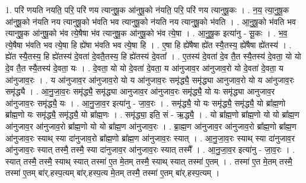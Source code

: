 \documentclass[17pt]{extarticle}
\begin{document}
1. परि॑ णयति नयति॒ परि॒ परि॑ णय त्यानुषू॒क आ॑नुषू॒को न॑यति॒ परि॒ परि॑ णय त्यानुषू॒कः । . न॒य॒ त्या॒नु॒षू॒क आ॑नुषू॒को न॑यति नय त्यानुषू॒को भ॑वति भव त्यानुषू॒को न॑यति नय त्यानुषू॒को भ॑वति । . आ॒नु॒षू॒को भ॑वति भव त्यानुषू॒क आ॑नुषू॒को भ॑व त्ये॒षैषा भ॑व त्यानुषू॒क आ॑नुषू॒को भ॑व त्ये॒षा । . आ॒नु॒षू॒क इत्या॑नु - सू॒कः । . भ॒व॒ त्ये॒षैषा भ॑वति भव त्ये॒षा हि ह्ये॑षा भ॑वति भव त्ये॒षा हि । . ए॒षा हि ह्ये॑षैषा ह्ये॑त स्यै॒तस्य॒ ह्ये॑षैषा ह्ये॑तस्य॑ । . ह्ये॑त स्यै॒तस्य॒ हि ह्ये॑तस्य॑ दे॒वता॑ दे॒वतै॒तस्य॒ हि ह्ये॑तस्य॑ दे॒वता᳚ । . ए॒तस्य॑ दे॒वता॑ दे॒व तै॒त स्यै॒तस्य॑ दे॒वता॒ यो यो दे॒व तै॒त स्यै॒तस्य॑ दे॒वता॒ यः । . दे॒वता॒ यो यो दे॒वता॑ दे॒वता॒ य आ॑नुजाव॒र आ॑नुजाव॒रो यो दे॒वता॑ दे॒वता॒ य आ॑नुजाव॒रः । . य आ॑नुजाव॒र आ॑नुजाव॒रो यो य आ॑नुजाव॒रः समृ॑द्ध्यै॒ समृ॑द्ध्या आनुजाव॒रो यो य आ॑नुजाव॒रः समृ॑द्ध्यै । . आ॒नु॒जा॒व॒रः समृ॑द्ध्यै॒ समृ॑द्ध्या आनुजाव॒र आ॑नुजाव॒रः समृ॑द्ध्यै॒ यो यः समृ॑द्ध्या आनुजाव॒र आ॑नुजाव॒रः समृ॑द्ध्यै॒ यः । . आ॒नु॒जा॒व॒र इत्या॑नु - जा॒व॒रः । . समृ॑द्ध्यै॒ यो यः समृ॑द्ध्यै॒ समृ॑द्ध्यै॒ यो ब्रा᳚ह्म॒णो ब्रा᳚ह्म॒णो यः समृ॑द्ध्यै॒ समृ॑द्ध्यै॒ यो ब्रा᳚ह्म॒णः । . समृ॑द्ध्या॒ इति॒ सं - ऋ॒द्ध्यै॒ । . यो ब्रा᳚ह्म॒णो ब्रा᳚ह्म॒णो यो यो ब्रा᳚ह्म॒ण आ॑नुजाव॒र आ॑नुजाव॒रो ब्रा᳚ह्म॒णो यो यो ब्रा᳚ह्म॒ण आ॑नुजाव॒रः । . ब्रा॒ह्म॒ण आ॑नुजाव॒र आ॑नुजाव॒रो ब्रा᳚ह्म॒णो ब्रा᳚ह्म॒ण आ॑नुजाव॒रः स्याथ् स्या दा॑नुजाव॒रो ब्रा᳚ह्म॒णो ब्रा᳚ह्म॒ण आ॑नुजाव॒रः स्यात् । . आ॒नु॒जा॒व॒रः स्याथ् स्या दा॑नुजाव॒र आ॑नुजाव॒रः स्यात् तस्मै॒ तस्मै॒ स्या दा॑नुजाव॒र आ॑नुजाव॒रः स्यात् तस्मै᳚ । . आ॒नु॒जा॒व॒र इत्या॑नु - जा॒व॒रः । . स्यात् तस्मै॒ तस्मै॒ स्याथ् स्यात् तस्मा॑ ए॒त मे॒तम् तस्मै॒ स्याथ् स्यात् तस्मा॑ ए॒तम् । . तस्मा॑ ए॒त मे॒तम् तस्मै॒ तस्मा॑ ए॒तम् बा॑र्.हस्प॒त्यम् बा॑र्.हस्प॒त्य मे॒तम् तस्मै॒ तस्मा॑ ए॒तम् बा॑र्.हस्प॒त्यम् । \newline
\end{document}
